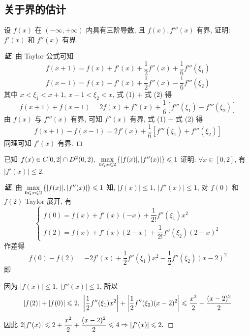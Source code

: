 \subsection{关于界的估计}

\begin{example}
    设 $f(x)$ 在 $(-\infty,+\infty)$ 内具有三阶导数, 且 $f(x),f'''(x)$ 有界, 证明: $f'(x)$ 和 $f''(x)$ 有界.
\end{example}
\begin{proof}[{\songti \textbf{证}}]
    由 Taylor 公式可知
    \begin{equation}
        f(x+1 ) =f(x)+f'(x) +\dfrac{1}{2}f''(x) +\dfrac{1}{6}f'''(\xi_1 ) \tag{1}
    \end{equation}
    \begin{equation}
        f(x-1 ) =f(x) -f'(x) +\dfrac{1}{2}f''(x) -\dfrac{1}{6}f'''(\xi_2 ) \tag{2}
    \end{equation}
    其中 $x <\xi _{1} <x+1,~x-1 <\xi _{2} <x$, 式 (1) $+$ 式 (2) 得
    $$f(x+1 ) +f(x-1 ) =2f(x) +f''(x) +\dfrac{1}{6}\left[ f'''(\xi_1 ) -f'''(\xi_2 ) \right] $$
    由 $f(x)$ 与 $f'''(x)$ 有界, 可知 $f''(x)$ 有界, 式 (1) $-$ 式 (2) 得
    $$f(x+1 ) -f(x-1 ) =2f'(x) +\dfrac{1}{6}\left[ f'''(\xi_1 ) +f'''(\xi_2 ) \right] $$
    同理可知 $f'(x)$ 有界.
\end{proof}

\begin{example}
    已知 $f(x)\in C[0,2]\cap D^2(0,2),~\max\limits_{0\leqslant x\leqslant 2}\qty{|f(x)|,|f''(x)|}\leqslant 1$ 证明: $\forall x\in[0,2]$, 有 $|f'(x)|\leqslant 2.$
\end{example}
\begin{proof}[{\songti \textbf{证}}]
    由 $\max\limits_{0\leqslant x\leqslant 2}\qty{|f(x)|,|f''(x)|}\leqslant 1$ 知, $|f(x)|\leqslant 1,~|f''(x)|\leqslant 1$, 对 $f(0)$ 和 $f(2)$ Taylor 展开, 有
    $$\begin{cases}
        f(0)=f(x)+f'(x)(-x)+\dfrac{1}{2!}f''(\xi_1)x^2\\[6pt]
        f(2)=f(x)+f'(x)(2-x)+\dfrac{1}{2!}f''(\xi_2)(2-x)^2
    \end{cases}$$
    作差得 $$f(0)-f(2)=-2f'(x)+\dfrac{1}{2}f''(\xi_1)x^2-\dfrac{1}{2}f''(\xi_2)(x-2)^2$$ 即 
    因为 $|f(x)|\leqslant 1,~|f''(x)|\leqslant 1$, 所以 $$|f(2)|+|f(0)|\leqslant 2,~\qty|\dfrac{1}{2}f''(\xi_1)x^2|+\qty|\dfrac{1}{2}f''(\xi_2)(x-2)^2|\leqslant \dfrac{x^2}{2}+\dfrac{(x-2)^2}{2}$$
    因此 $2\qty|f'(x)|\leqslant 2+\dfrac{x^2}{2}+\dfrac{(x-2)^2}{2}\leqslant 4\Rightarrow |f'(x)|\leqslant 2.$
\end{proof}

